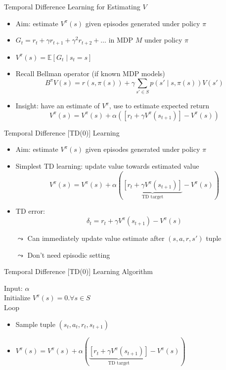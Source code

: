 \begin{frame}[c]{Temporal Difference Learning for Estimating $V$}

\begin{itemize}
	\item Aim: estimate $V^\pi(s)$ given episodes generated under policy $\pi$
	\item $G_t = r_t + \gamma r_{t+1} + \gamma^2 r_{t+2} + \ldots$  in MDP $M$ under policy $\pi$
	\item $V^\pi(s) = \mathbb{E}[G_t \mid s_t = s]$
	\smallskip
	\pause
	\item Recall Bellman operator (if known MDP models)
	$$B^\pi V(s) = r(s,\pi(s)) + \gamma \sum_{s'\in S} p(s'\mid s, \pi(s)) V(s')$$
	\pause
	\item Insight: have an estimate of $V^\pi$, use to estimate expected return
	$$ V^\pi(s) = V^\pi(s) + \alpha ([r_t + \gamma V^\pi (s_{t+1})] - V^\pi(s))$$
\end{itemize}


\end{frame}
\begin{frame}[c]{Temporal Difference [TD(0)] Learning}
	
	\begin{itemize}
		\item Aim: estimate $V^\pi(s)$ given episodes generated under policy $\pi$
		\item Simplest TD learning: update value towards estimated value
		$$ V^\pi(s) = V^\pi(s) + \alpha (\underbrace{[r_t + \gamma V^\pi (s_{t+1})]}_{\text{TD target}} - V^\pi(s))$$
		\pause
		\item TD error:
		$$ \delta_t = r_t + \gamma V^\pi(s_{t+1}) - V^\pi (s) $$
		\pause
		\item[$\leadsto$] Can immediately update value estimate after $(s,a,r,s')$ tuple
		\item[$\leadsto$] Don’t need episodic setting
	\end{itemize}
	
\end{frame}
\begin{frame}[c]{Temporal Difference [TD(0)] Learning Algorithm}
	
	Input: $\alpha$\\
	Initialize $V^\pi(s) = 0. \forall s \in S$\\
	Loop\\
	\begin{itemize}
		\item Sample tuple $(s_t, a_t, r_t, s_{t+1})$
		\item $V^\pi(s) = V^\pi(s) + \alpha (\underbrace{[r_t + \gamma V^\pi (s_{t+1})]}_{\text{TD target}} - V^\pi(s))$
	\end{itemize}
	
\end{frame}
